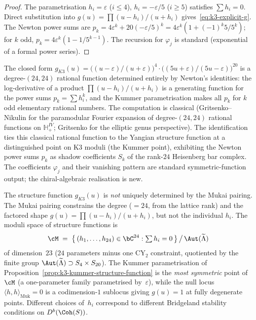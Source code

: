 \begin{proof}
The parametrisation $h_i = \varepsilon$ ($i \leq 4$),
$h_i = -\varepsilon/5$ ($i \geq 5$) satisfies $\sum h_i = 0$.
Direct substitution into $g(u) = \prod(u - h_i)/(u + h_i)$
gives~\eqref{eq:k3-explicit-g}. The Newton power sums are
$p_k = 4\varepsilon^k + 20(-\varepsilon/5)^k
= 4\varepsilon^k(1 + (-1)^k 5/5^k)$; for $k$ odd,
$p_k = 4\varepsilon^k(1 - 1/5^{k-1})$.
The recursion for $\varphi_j$ is standard
(exponential of a formal power series).
\end{proof}

\begin{remark}
\label{rem:k3-kummer-structure-function-classical}
The closed form
$g_{K3}(u) = \bigl((u-\varepsilon)/(u+\varepsilon)\bigr)^4 \cdot
\bigl((5u+\varepsilon)/(5u-\varepsilon)\bigr)^{20}$
is a degree-$(24,24)$ rational function determined entirely by Newton's
identities: the log-derivative of a product $\prod (u-h_i)/(u+h_i)$ is
a generating function for the power sums $p_k = \sum h_i^k$, and the
Kummer parametrisation makes all $p_k$ for $k$ odd elementary rational
numbers. The computation is classical (Gritsenko--Nikulin
\cite{GritsenkoNikulin1995,GritsenkoNikulin1998} for the paramodular
Fourier expansion of degree-$(24,24)$ rational functions on
$\mathbb{H}^{IV}_+$; Gritsenko \cite{Gritsenko1999} for the elliptic
genus perspective). The identification ties this classical rational
function to the Yangian structure function at a distinguished point on
K3 moduli (the Kummer point), exhibiting the Newton power sums $p_k$
as shadow coefficients $S_k$ of the rank-$24$ Heisenberg bar complex. The coefficients $\varphi_j$ and their
vanishing pattern are standard symmetric-function output; the
chiral-algebraic realisation is new.
\end{remark}

\begin{remark}
\label{rem:k3-structure-function-moduli}
The structure function $g_{K3}(u)$ is \emph{not} uniquely determined by
the Mukai pairing. The Mukai pairing constrains the degree ($= 24$,
from the lattice rank) and the factored shape
$g(u) = \prod(u - h_i)/(u + h_i)$, but not the individual $h_i$.
The moduli space of structure functions is
\[
 \cM \;=\;
 \bigl\{\, (h_1, \ldots, h_{24}) \in \bC^{24}
 : \textstyle\sum h_i = 0 \,\bigr\}
 \,\big/\, \Aut(\widetilde\Lambda)
\]
of dimension~$23$ ($24$ parameters minus one CY$_2$ constraint,
quotiented by the finite group $\Aut(\widetilde\Lambda) \supset
S_4 \times S_{20}$). The Kummer
parametrisation of Proposition~\ref{prop:k3-kummer-structure-function}
is the \emph{most symmetric} point of~$\cM$ (a one-parameter
family parametrised by~$\varepsilon$), while the null locus
$\langle h, h \rangle_{\mathrm{Muk}} = 0$ is a codimension-$1$
sublocus giving $g(u) = 1$ at fully degenerate points.
Different choices of~$h_i$ correspond to different Bridgeland
stability conditions on $D^b(\Coh(S))$.
\end{remark}

